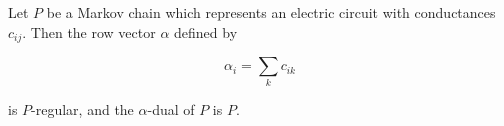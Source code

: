 Let $P$ be a Markov chain which represents an electric circuit with conductances $c_{ij}$. Then the row vector $\alpha$ defined by

$$\alpha_i = \sum_k c_{ik}$$

is $P$-regular, and the $\alpha$-dual of $P$ is $P$.
